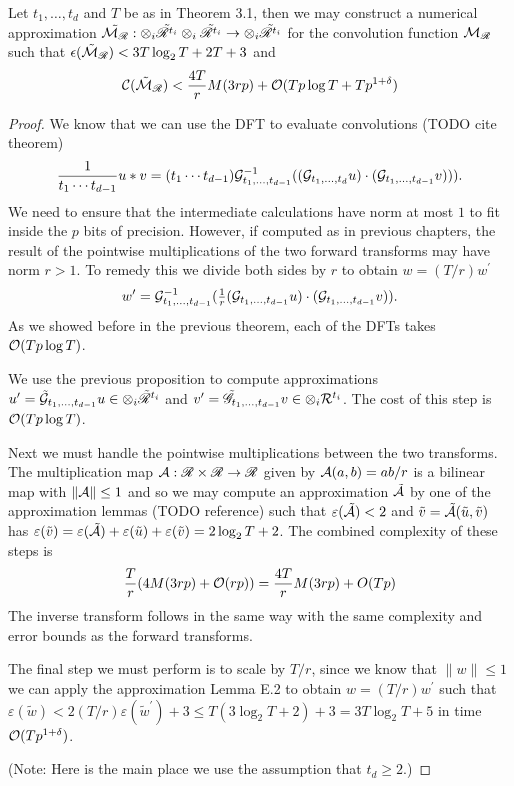 \begin{proposition}
    Let $t_1, \ldots, t_d$ and $T$ be as in Theorem 3.1, then we may construct a numerical approximation $\tilde{\mathcal M_{\mathscr{R}}}: \otimes_i \tilde{\mathscr{R}^{t_i}} \otimes_i \tilde{\mathscr{R}^{t_i}} \to \otimes_i \tilde{\mathscr{R}^{t_i}}$ for the convolution function $\mathcal M_{\mathscr{R}}$ such that $\epsilon(\tilde{\mathcal M}_{\mathscr{R}}) < 3T \log_2 T + 2T + 3$ and
    \[
        \mathcal C(\tilde{\mathcal M}_{\mathscr{R}}) < \frac{4T}{r}M(3rp) + \mathcal O(Tp \log T + T p^{1 + \delta})
    \]
\end{proposition}

\begin{proof}
    We know that we can use the DFT to evaluate convolutions (TODO cite theorem)
    \[
        \frac{1}{t_1 \cdots t_{d-1}}u \ast v = (t_1 \cdots t_{d-1})\mathcal G^{-1}_{t_1, \ldots, t_{d-1}}((\mathcal G_{t_1, \ldots, t_d}u)\cdot (\mathcal G_{t_1, \ldots, t_{d-1}} v))).
    \]
    We need to ensure that the intermediate calculations have norm at most $1$ to fit inside the $p$ bits of precision. However, if computed as in previous chapters, the result of the pointwise multiplications of the two forward transforms may have norm $r > 1$. To remedy this we divide both sides by $r$ to obtain $w = (T/r)w^\prime$
    \[
        w^\prime = \mathcal G^{-1}_{t_1, \ldots, t_{d-1}}(\tfrac{1}{r}(\mathcal G_{t_1, \ldots, t_{d-1}}u) \cdot (\mathcal G_{t_1, \ldots, t_{d-1}}v)).
    \]
    As we showed before in the previous theorem, each of the DFTs takes $\mathcal O(Tp\log T)$.

    We use the previous proposition to compute approximations $u^\prime = \tilde{\mathcal G}_{t_1, \ldots, t_{d-1}} u \in \otimes_i \tilde{\mathscr{R}}^{t_i}$ and $v^\prime = \tilde{\mathscr{G}}_{t_1, \ldots, t_{d-1}} v \in \otimes_i \mathcal R^{t_i}$. The cost of this step is $\mathcal O(Tp \log T)$.

    Next we must handle the pointwise multiplications between the two transforms. The multiplication map $\mathcal A: \mathscr{R} \times \mathscr{R} \to \mathscr{R}$ given by $\mathcal A(a, b) = ab/r$ is a bilinear map with $\|\mathcal A\| \le 1$ and so we may compute an approximation $\tilde{\mathcal A}$ by one of the approximation lemmas (TODO reference) such that $\varepsilon(\tilde{\mathcal A}) < 2$ and $\tilde{v} = \tilde{\mathcal A}(\tilde{u}, \tilde{v})$ has $\varepsilon(\tilde{v}) = \varepsilon(\tilde{\mathcal A}) + \varepsilon(\tilde{u}) + \varepsilon(\tilde{v}) = 2\log_2 T + 2$. The combined complexity of these steps is
    \[
        \frac{T}{r}(4M(3rp) + \mathcal O(rp)) = \frac{4T}{r} M(3rp) + O(Tp)
    \]
    The inverse transform follows in the same way with the same complexity and error bounds as the forward transforms.

    The final step we must perform is to scale by $T/r$, since we know that $\|w\| \le 1$ we can apply the approximation Lemma E.2 to obtain $w = (T/r)w^\prime$ such that $\varepsilon(\tilde{w}) < 2(T/r)\varepsilon(\tilde{w}^\prime) + 3 \le T(3 \log_2 T + 2) + 3 = 3T\log_2 T + 5$ in time $\mathcal O(Tp^{1 + \delta})$.

    (Note: Here is the main place we use the assumption that $t_d \ge 2$.)
\end{proof}


